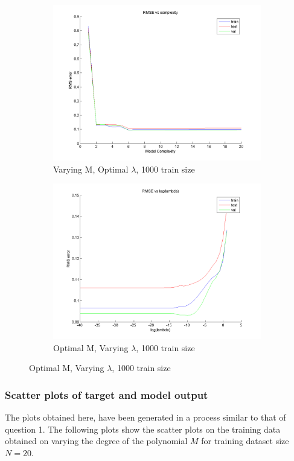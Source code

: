 \documentclass{article}
\begin{document}
\begin{figure}
\begin{subfigure}{.5\textwidth}
\centering
\includegraphics[width=\linewidth]{RMS_complexity_1000}
\caption{Varying M, Optimal $\lambda$, 1000 train size}
\end{subfigure}
\begin{subfigure}{.5\textwidth}
\includegraphics[width=\linewidth]{RMS_lambda_1000}
\caption{Optimal M, Varying $\lambda$, 1000 train size}
\end{subfigure}

\end{figure}

\subsubsection{Scatter plots of target and model output}
The plots obtained here, have been generated in a process similar to that of question 1. 
The following plots show the scatter plots on the training data obtained on varying the degree of the polynomial $M$ for training dataset size $N = 20$.
\end{document}
